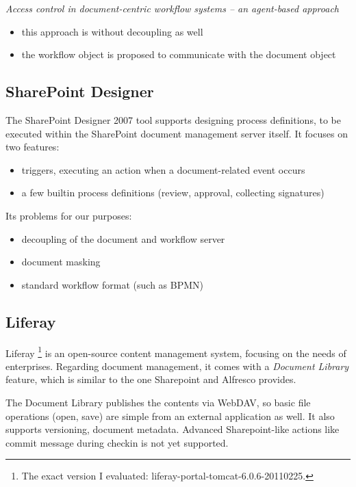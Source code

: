 \emph{Access control in document-centric workflow systems -- an agent-based approach} \cite{paper-access}
\begin{itemize}
\item this approach is without decoupling as well
\item the workflow object is proposed to communicate with the document object
\end{itemize}

\subsection*{SharePoint Designer}

The SharePoint Designer 2007 tool \cite{sp-designer} supports designing process definitions, to
be executed within the SharePoint document management server itself. It focuses on two features:

\begin{itemize}
\item triggers, executing an action when a document-related event occurs
\item a few builtin process definitions (review, approval, collecting signatures)
\end{itemize}

Its problems for our purposes:

\begin{itemize}
\item decoupling of the document and workflow server
\item document masking
\item standard workflow format (such as BPMN)
\end{itemize}

\subsection*{Liferay}

Liferay \cite{liferay}\footnote{The exact version I evaluated:
liferay-portal-tomcat-6.0.6-20110225.} is an open-source content management
system, focusing on the needs of enterprises. Regarding document management, it
comes with a \emph{Document Library} feature, which is similar to the one
Sharepoint and Alfresco provides.

The Document Library publishes the contents via WebDAV, so basic file
operations (open, save) are simple from an external application as well. It
also supports versioning, document metadata. Advanced Sharepoint-like actions
like commit message during checkin is not yet supported.

